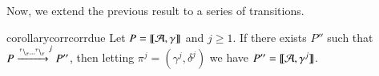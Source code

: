
 
 

Now, we extend the previous result to a series of transitions.
 
 \begin{restatable}[Correctness 2]{corollary}{corrcorrdue} 
 \label{corr:corr2}
  Let $P = \llbracket{\cal A},\gamma\rrbracket$ and $j\geq 1$.
If there exists  $P''$ such that $P \xrightarrow{{}^{\tau} \backslash_{\tau}\dots {}^{\tau} \backslash_{\tau}}^{j}P''$, then letting  $\pi^j=(\gamma^j,\delta^j)$ we have
$P'' =\llbracket{\cal A},\gamma^j\rrbracket$.
 \end{restatable}


